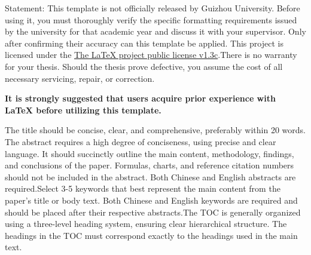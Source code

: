 \documentclass{GZUbachelorthesis}
\begin{document}
\maketitle %

\begin{tocabstract} %
\begin{abstract}[关键词一;关键词二;关键词三;关键词四] %
    首先声明：本模板不是贵州大学官方层面发布的指定模板，使用本模板前请务必核对学校官方在该年的具体格式要求，并与自己的导师交流，确认无误后才可应用。本项目开源，采用\href{https://www.latex-project.org/lppl/lppl-1-3c/}{\LaTeX 项目公共许可证v1.3}授权协议，若因使用本模板引起纠纷，模板的所有制作者概不负责。

    \textbf{强烈建议具备一定 \LaTeX 使用经验后再来使用本模板。}

    题目应简洁、明确、有概括性,字数不宜超过20个字.摘要要有高度的概括力,语言精练、明确.扼要叙述论文的主要内容、方法、成果和结论.摘要中不宜使用公式、图表,不标注引用文献编号.同时要有中、英文对照摘要,中文摘要约300\~{}500字.关键词从论文标题或正文中挑选3\~{}5个最能表达主要内容的词作为关键词,同时有中、英文对照,分别附于中、英文摘要后.目录一般按三级标题编写,要求标题层次清晰.目录中标题应与正文中标题一致.
\end{abstract}
\begin{enabstract} %
  Statement: This template is not officially released by Guizhou University. Before using it, you must thoroughly verify the specific formatting requirements issued by the university for that academic year and discuss it with your supervisor. Only after confirming their accuracy can this template be applied. This project is licensed under the \href{https://www.latex-project.org/lppl/lppl-1-3c/}{The LaTeX project public license v1.3c}.There is no warranty for your thesis. Should the thesis prove defective, you assume the cost of all necessary servicing, repair, or correction.

  \textbf{It is strongly suggested that users acquire prior experience with LaTeX before utilizing this template.}

  The title should be concise, clear, and comprehensive, preferably within 20 words. The abstract requires a high degree of conciseness, using precise and clear language. It should succinctly outline the main content, methodology, findings, and conclusions of the paper. Formulas, charts, and reference citation numbers should not be included in the abstract. Both Chinese and English abstracts are required.Select 3-5 keywords that best represent the main content from the paper's title or body text. Both Chinese and English keywords are required and should be placed after their respective abstracts.The TOC is generally organized using a three-level heading system, ensuring clear hierarchical structure. The headings in the TOC must correspond exactly to the headings used in the main text.
\end{enabstract}
\end{tocabstract}
\end{document}

